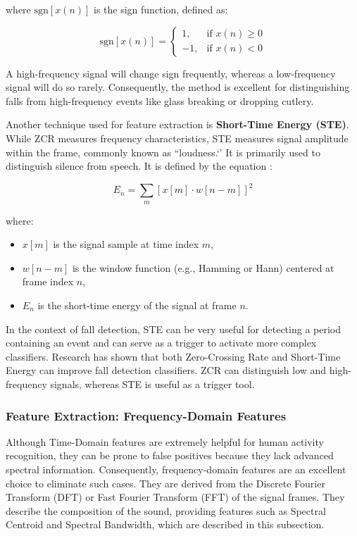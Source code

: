 \documentclass[11pt, a4paper, twoside]{article}
\begin{document}
where $\mathrm{sgn}[x(n)]$ is the sign function, defined as:

\begin{equation}
\mathrm{sgn}[x(n)] =
\begin{cases}
1, & \text{if } x(n) \ge 0 \\
-1, & \text{if } x(n) < 0
\end{cases}
\label{eq:sign_function}
\end{equation}

A high-frequency signal will change sign frequently, whereas a low-frequency signal will do so rarely. Consequently, the method is excellent for distinguishing falls from high-frequency events like glass breaking or dropping cutlery.

Another technique used for feature extraction is \textbf{Short-Time Energy (STE)}. While ZCR measures frequency characteristics, STE measures signal amplitude within the frame, commonly known as ``loudness.‘’ It is primarily used to distinguish silence from speech. It is defined by the equation \cite{rabiner1978digital}:

\begin{equation}
E_n = \sum_{m} [x[m] \cdot w[n-m]]^2
\end{equation}

where:
\begin{itemize}
\item $x[m]$ is the signal sample at time index $m$,
\item $w[n-m]$ is the window function (e.g., Hamming or Hann) centered at frame index $n$,
\item $E_n$ is the short-time energy of the signal at frame $n$.
\end{itemize}

In the context of fall detection, STE can be very useful for detecting a period containing an event and can serve as a trigger to activate more complex classifiers. Research has shown that both Zero-Crossing Rate and Short-Time Energy can improve fall detection classifiers. ZCR can distinguish low and high-frequency signals, whereas STE is useful as a trigger tool.

\subsubsection{Feature Extraction: Frequency-Domain Features}
Although Time-Domain features are extremely helpful for human activity recognition, they can be prone to false positives because they lack advanced spectral information. Consequently, frequency-domain features are an excellent choice to eliminate such cases. They are derived from the Discrete Fourier Transform (DFT) or Fast Fourier Transform (FFT) of the signal frames. They describe the composition of the sound, providing features such as Spectral Centroid and Spectral Bandwidth, which are described in this subsection.
\end{document}
